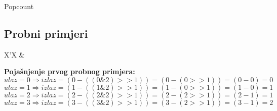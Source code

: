 \begin{statement}[
  problempoints=110,
  timelimit=1 sekunda,
  memorylimit=512 MiB,
]{Popcount}
\subsection*{Probni primjeri}
\begin{tabularx}{\textwidth}{X'X}
 &
\end{tabularx}

\textbf{Pojašnjenje prvog probnog primjera:} \\
$ulaz=0 \Rightarrow izlaz=(0-((0\&2)>>1))=(0-(0>>1))=(0-0)=0$\\
$ulaz=1 \Rightarrow izlaz=(1-((1\&2)>>1))=(1-(0>>1))=(1-0)=1$\\
$ulaz=2 \Rightarrow izlaz=(2-((2\&2)>>1))=(2-(2>>1))=(2-1)=1$\\
$ulaz=3 \Rightarrow izlaz=(3-((3\&2)>>1))=(3-(2>>1))=(3-1)=2$

\end{statement}

